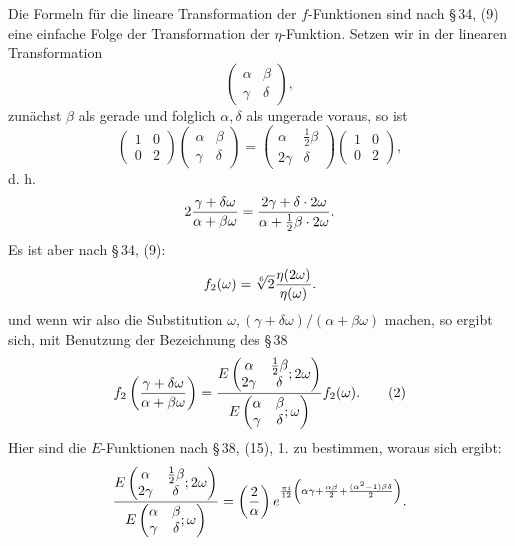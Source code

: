 \documentclass[11pt]{article}
\providecommand{\Jac}[2]{\left(\frac{#1}{#2}\right)}
\begin{document}
Die Formeln für die lineare Transformation der $f$-Funktionen sind nach \S\,34, (9) eine einfache Folge der Transformation der $\eta$-Funktion. Setzen wir in der linearen Transformation
\[
\begin{pmatrix}\alpha&\beta\\ \gamma&\delta\end{pmatrix},
\]
zunächst $\beta$ als gerade und folglich $\alpha,\delta$ als ungerade voraus, so ist
\begin{equation}
\begin{pmatrix}1&0\\0&2\end{pmatrix}
\begin{pmatrix}\alpha&\beta\\ \gamma&\delta\end{pmatrix}
=\begin{pmatrix}\alpha&\frac12\beta\\2\gamma&\delta\end{pmatrix}
\begin{pmatrix}1&0\\0&2\end{pmatrix},
\tag{1}
\end{equation}
d. h.
\[
2{\gamma+
\delta\omega\over\alpha+
\beta\omega}
={2\gamma+
\delta\cdot2\omega\over\alpha+\frac12\beta\cdot2\omega}.
\]
Es ist aber nach \S\,34, (9):
\[
f_2(\omega)=\sqrt[6]{2}{\eta(2\omega)\over\eta(\omega)}.
\]
und wenn wir also die Substitution $\omega, (\gamma+
\delta\omega)/(\alpha+
\beta\omega)$ machen, so ergibt sich, mit Benutzung der Bezeichnung des \S\,38
\begin{equation}
f_2\left({\gamma+
\delta\omega\over\alpha+
\beta\omega}\right)
={E\left(\begin{matrix}\alpha&\frac12\beta\\2\gamma&\delta\end{matrix};2\omega\right)
\over
E\left(\begin{matrix}\alpha&\beta\\\gamma&\delta\end{matrix};\omega\right)}f_2(\omega). 
\tag{2}
\end{equation}
Hier sind die $E$-Funktionen nach \S\,38, (15), 1. zu bestimmen, woraus sich ergibt:
\[
{E\left(\begin{matrix}\alpha&\frac12\beta\\2\gamma&\delta\end{matrix};2\omega\right)
\over
E\left(\begin{matrix}\alpha&\beta\\\gamma&\delta\end{matrix};\omega\right)}
=
\Jac{2}{\alpha}e^{{\pi i\over12}\left(\alpha\gamma+{\alpha\beta\over2}+{(\alpha^2-1)\beta\delta\over2}\right)}.
\]
\end{document}
